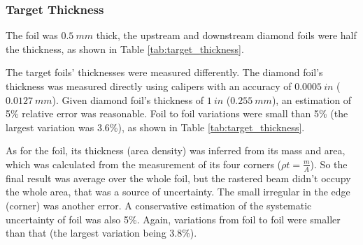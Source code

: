 \subsubsection{Target Thickness}
The \Pb foil was $0.5\ mm$ thick, the upstream and downstream diamond foils 
were half the \Pb thickness, as shown in Table \ref{tab:target_thickness}.

The target foils' thicknesses were measured differently. The diamond foil's 
thickness was measured directly using calipers with an accuracy of $0.0005 \ in$ ($0.0127 \ mm$).
Given diamond foil's thickness of $1\ in$ ($0.255 \ mm$), an estimation of 5\% 
relative error was reasonable. Foil to foil variations were small than 5\% (the
largest variation was 3.6\%), as shown in Table \ref{tab:target_thickness}.

As for the \Pb foil, its thickness (area density) was inferred from its mass 
and area, which was calculated from the measurement of its four corners ($\rho t = \frac{m}{A}$). 
So the final result was average over the whole foil, but the rastered beam 
didn't occupy the whole area, that was a source of uncertainty. The small irregular
in the edge (corner) was another error. A conservative estimation of the systematic
uncertainty of \Pb foil was also 5\%. Again, variations from foil to foil were 
smaller than that (the largest variation being 3.8\%).

